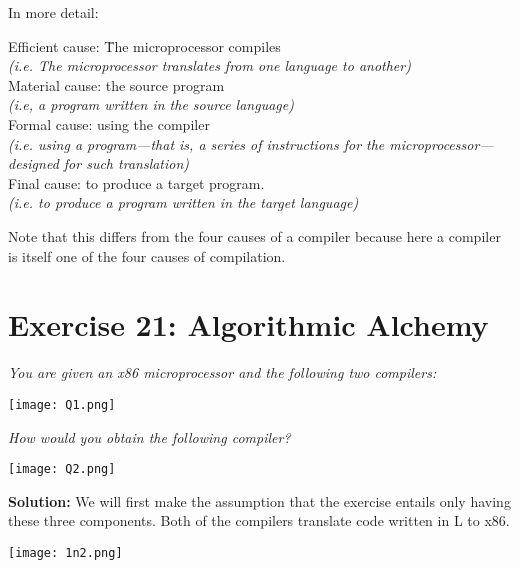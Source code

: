 \documentclass{article}
\begin{document}
In more detail:

\begin{tabbing}
Efficient cause: \= The microprocessor compiles\\
\textit{(i.e. The microprocessor translates from one language to another)}\\
Material cause: \> the source program\\
\textit{(i.e, a program written in the source language)}\\
Formal cause: \> using the compiler\\
\textit{(i.e. using a program—that is, a series of instructions for the microprocessor—designed for such translation)}\\
Final cause: \> to produce a target program.\\
\textit{(i.e. to produce a program written in the target language)}\\
\end{tabbing}

\linebreak \linebreak

Note that this differs from the four causes of a compiler because here a compiler is itself one of the four causes of compilation.

\newpage

\section{Exercise 21: Algorithmic Alchemy}

\textit{You are given an x86 microprocessor and the following two compilers:}
\linebreak

\texttt{[image: Q1.png]}

\textit{How would you obtain the following compiler?}
\linebreak

\texttt{[image: Q2.png]}

\noindent \textbf{Solution:} \linebreak \linebreak
We will first make the assumption that the exercise entails only having these three components. Both of the compilers translate code written in L to x86.
\linebreak

\texttt{[image: 1n2.png]}
\linebreak
\end{document}
